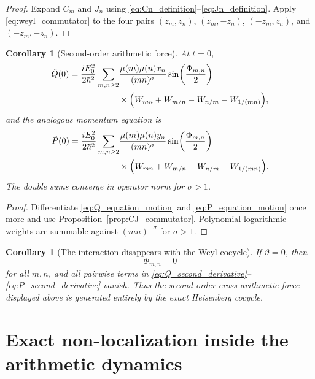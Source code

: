 \documentclass[11pt]{amsart}
\numberwithin{equation}{section}
\theoremstyle{plain}
\newtheorem{corollary}[theorem]{Corollary}
\theoremstyle{definition}
\theoremstyle{remark}
\begin{document}
\begin{proof}
Expand $C_m$ and $J_n$ using
\eqref{eq:Cn_definition}--\eqref{eq:Jn_definition}.  Apply
\eqref{eq:weyl_commutator} to the four pairs
$(z_m,z_n)$, $(z_m,-z_n)$, $(-z_m,z_n)$, and $(-z_m,-z_n)$.
\end{proof}

\begin{corollary}[Second-order arithmetic force]
\label{cor:second_order_force}
At $t=0$,
\begin{align}
\ddot Q(0)
=
\frac{iE_0^2}{2\hbar^2}
\sum_{m,n\ge2}
&\frac{\mu(m)\mu(n)x_n}{(mn)^{\sigma}}
\sin\!\left(\frac{\Phi_{m,n}}{2}\right)
\notag\\
&\times
\Bigl(
W_{mn}+W_{m/n}-W_{n/m}-W_{1/(mn)}
\Bigr),
\label{eq:Q_second_derivative}
\end{align}
and the analogous momentum equation is
\begin{align}
\ddot P(0)
=
\frac{iE_0^2}{2\hbar^2}
\sum_{m,n\ge2}
&\frac{\mu(m)\mu(n)y_n}{(mn)^{\sigma}}
\sin\!\left(\frac{\Phi_{m,n}}{2}\right)
\notag\\
&\times
\Bigl(
W_{mn}+W_{m/n}-W_{n/m}-W_{1/(mn)}
\Bigr).
\label{eq:P_second_derivative}
\end{align}
The double sums converge in operator norm for $\sigma>1$.
\end{corollary}

\begin{proof}
Differentiate \eqref{eq:Q_equation_motion} and
\eqref{eq:P_equation_motion} once more and use
Proposition~\ref{prop:CJ_commutator}.  Polynomial logarithmic weights are
summable against $(mn)^{-\sigma}$ for $\sigma>1$.
\end{proof}

\begin{corollary}[The interaction disappears with the Weyl cocycle]
\label{cor:interaction_disappears}
If $\vartheta=0$, then
\begin{equation}
\Phi_{m,n}=0
\label{eq:Phi_zero}
\end{equation}
for all $m,n$, and all pairwise terms in
\eqref{eq:Q_second_derivative}--\eqref{eq:P_second_derivative} vanish.
Thus the second-order cross-arithmetic force displayed above is generated
entirely by the exact Heisenberg cocycle.
\end{corollary}

\section{Exact non-localization inside the arithmetic dynamics}
\label{sec:nonlocalization}
\end{document}
